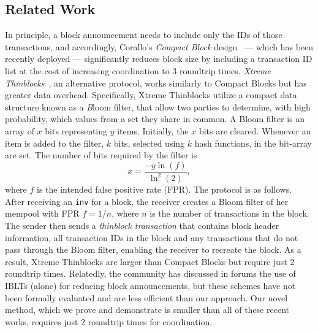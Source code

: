 \subsection{Related Work} 
In principle, a block announcement needs to include only the IDs of those transactions,
and accordingly, Corallo's {\em Compact Block} design~\cite{Corallo:2016} --- which has been recently deployed --- significantly reduces block size by including a  transaction ID list at the cost of increasing coordination to 3 roundtrip times.
%
{\em Xtreme Thinblocks}~\cite{Tschipper:2016}, an alternative protocol, works similarly to Compact Blocks but has greater data overhead. Specifically, Xtreme Thinblocks utilize a compact data structure known as a {\emph Bloom filter}, that allow two parties to determine, with high probability, which values from a set they share in common. A Bloom filter is an array of $x$ bits
representing $y$ items. Initially, the $x$ bits are cleared. Whenever
an item is added to the filter, $k$ bits, selected using $k$ hash functions, in the bit-array are set. The number of bits
required by the filter is 
\begin{equation}
x =\frac{-y\ln(f)}{\ln^2(2)}, 
\end{equation}
where $f$ is
the intended false positive rate (FPR). The protocol is as follows. After receiving an {\tt inv} for a
 block, the receiver creates a Bloom filter of her mempool with FPR
 $f=1/n$, where $n$ is the number of transactions in the block. The
 sender then sends a \textit{thinblock transaction} that contains
 block header information, all transaction IDs in the block and any
 transactions that do not pass through the Bloom filter, enabling the
 receiver to recreate the block.
 As a result, Xtreme Thinblocks are larger than Compact Blocks but require just 2 roundtrip times. Relatedly, the community has discussed in forums the use of IBLTs (alone) for reducing block announcements\cite{andresen:2014,Russel:2014}, but these schemes have not been formally evaluated and are less efficient than our approach. Our novel method, which we prove and demonstrate is smaller than all of these recent works, requires just 2 roundtrip times for coordination.

